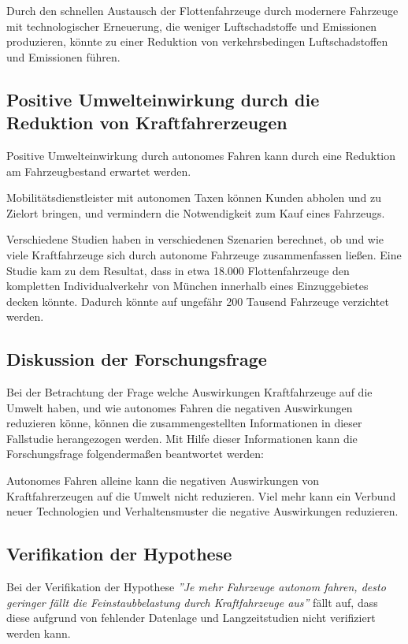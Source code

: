 Durch den schnellen Austausch der Flottenfahrzeuge durch modernere Fahrzeuge mit technologischer Erneuerung,
die weniger Luftschadstoffe und Emissionen produzieren, könnte zu einer Reduktion von verkehrsbedingen Luftschadstoffen und Emissionen führen.

\subsection{Positive Umwelteinwirkung durch die Reduktion von Kraftfahrerzeugen}
Positive Umwelteinwirkung durch autonomes Fahren kann durch eine
Reduktion am Fahrzeugbestand erwartet werden.

Mobilitätsdienstleister mit autonomen Taxen können
Kunden abholen und zu Zielort bringen,
und vermindern die Notwendigkeit zum Kauf eines Fahrzeugs.

Verschiedene Studien haben in verschiedenen Szenarien berechnet, ob und wie viele Kraftfahrzeuge sich durch autonome Fahrzeuge zusammenfassen ließen.
Eine Studie kam zu dem Resultat, dass in etwa 18.000 Flottenfahrzeuge den kompletten Individualverkehr von München innerhalb eines Einzuggebietes decken könnte.
Dadurch könnte auf ungefähr 200 Tausend Fahrzeuge verzichtet werden.
\cite{infrastrukturen}
\newpage

\subsection{Diskussion der Forschungsfrage}
Bei der Betrachtung der Frage welche Auswirkungen Kraftfahrzeuge auf die Umwelt haben, und wie autonomes Fahren die negativen Auswirkungen reduzieren könne,
können die zusammengestellten Informationen in dieser Fallstudie herangezogen werden.
Mit Hilfe dieser Informationen kann die Forschungsfrage folgendermaßen beantwortet werden:

Autonomes Fahren alleine kann die negativen Auswirkungen von Kraftfahrerzeugen auf die Umwelt nicht reduzieren.
Viel mehr kann ein Verbund neuer Technologien und Verhaltensmuster die negative Auswirkungen reduzieren.

\subsection{Verifikation der Hypothese}
Bei der Verifikation der Hypothese \textit{''Je mehr Fahrzeuge
	autonom fahren, desto geringer fällt die Feinstaubbelastung durch Kraftfahrzeuge aus''}
fällt auf, dass diese aufgrund von fehlender Datenlage und Langzeitstudien nicht verifiziert werden kann.
